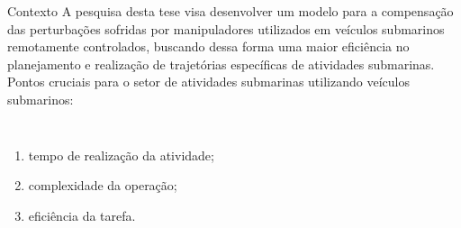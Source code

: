\begin{frame}[t]{Contexto} 
    \transdissolve[duration=0.5]
    A pesquisa desta tese visa desenvolver um modelo para a compensação das perturbações sofridas por manipuladores utilizados em veículos submarinos remotamente controlados, buscando dessa forma uma maior eficiência no planejamento e realização de trajetórias específicas de atividades submarinas.\\
    \vspace*{0.2cm}
    Pontos cruciais para o setor de atividades submarinas utilizando veículos submarinos:
    \newline
        \begin{columns}[c]
                \begin{enumerate}
                    \item tempo de realização da atividade;
                    \item complexidade da operação;
                    \item eficiência da tarefa.
                \end{enumerate}
        \end{columns}
\end{frame}
